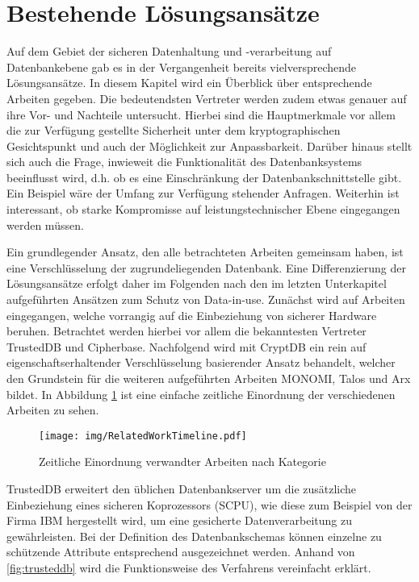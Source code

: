\section{Bestehende Lösungsansätze}

Auf dem Gebiet der sicheren Datenhaltung und -verarbeitung auf Datenbankebene gab es in der Vergangenheit bereits vielversprechende Lösungsansätze. In diesem Kapitel wird ein Überblick über entsprechende Arbeiten gegeben. Die bedeutendsten Vertreter werden zudem etwas genauer auf ihre Vor- und Nachteile untersucht. Hierbei sind die Hauptmerkmale vor allem die zur Verfügung gestellte Sicherheit unter dem kryptographischen Gesichtspunkt und auch der Möglichkeit zur Anpassbarkeit. Darüber hinaus stellt sich auch die Frage, inwieweit die Funktionalität des Datenbanksystems beeinflusst wird, d.h. ob es eine Einschränkung der Datenbankschnittstelle gibt. Ein Beispiel wäre der Umfang zur Verfügung stehender Anfragen. Weiterhin ist interessant, ob starke Kompromisse auf leistungstechnischer Ebene eingegangen werden müssen.

Ein grundlegender Ansatz, den alle betrachteten Arbeiten gemeinsam haben, ist eine Verschlüsselung der zugrundeliegenden Datenbank. Eine Differenzierung der Lösungsansätze erfolgt daher im Folgenden nach den im letzten Unterkapitel aufgeführten Ansätzen zum Schutz von Data-in-use. Zunächst wird auf Arbeiten eingegangen, welche vorrangig auf die Einbeziehung von sicherer Hardware beruhen. Betrachtet werden hierbei vor allem die bekanntesten Vertreter TrustedDB und Cipherbase. Nachfolgend wird mit CryptDB ein rein auf eigenschaftserhaltender Verschlüsselung basierender Ansatz behandelt, welcher den Grundstein für die weiteren aufgeführten Arbeiten MONOMI, Talos und Arx bildet. In Abbildung \ref{fig:timeline} ist eine einfache zeitliche Einordnung der verschiedenen Arbeiten zu sehen.

\begin{figure}
	\texttt{[image: img/RelatedWorkTimeline.pdf]}
	\centering
	\caption{Zeitliche Einordnung verwandter Arbeiten nach Kategorie}
	\label{fig:timeline}
\end{figure}

TrustedDB \cite{Bajaj2013} erweitert den üblichen Datenbankserver um die zusätzliche Einbeziehung eines sicheren Koprozessors (SCPU), wie diese zum Beispiel von der Firma IBM hergestellt wird, um eine gesicherte Datenverarbeitung zu gewährleisten. Bei der Definition des Datenbankschemas können einzelne zu schützende Attribute entsprechend ausgezeichnet werden. Anhand von \ref{fig:trusteddb} wird die Funktionsweise des Verfahrens vereinfacht erklärt. 

